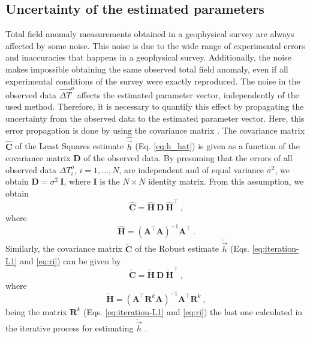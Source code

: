 \documentclass[journal abbreviation, npg]{copernicus}
\begin{document}
\subsection{Uncertainty of the estimated parameters}

Total field anomaly measurements obtained in a geophysical survey are always affected by some noise. This noise is due to the wide range of experimental errors and inaccuracies that happens in a geophysical survey. Additionally, the noise makes impossible obtaining the same observed total field anomaly, even if all experimental conditions of the survey were exactly reproduced. The noise in the observed data $\vec{\Delta T}^{o}$ affects the estimated parameter vector, independently of the used method. Therefore, it is necessary to quantify this effect by propagating the uncertainty from the observed data to the estimated parameter vector. Here, this error propagation is done by using the covariance matrix \citep{bard1973, aster-etal2005}. The covariance matrix $\hat{\mathbf{C}}$ of the Least Squares estimate $\hat{\vec{h}}$ (Eq. \ref{eq:h_hat}) is given as a function of the covariance matrix $\mathbf{D}$ of the observed data. By presuming that 
the errors of all observed data ${\Delta T}^{o}_{i}$, $i = 1, ..., N$, are independent and of equal variance $\sigma^{2}$, we obtain $\mathbf{D} = \sigma^{2} \: \mathbf{I}$, where $\mathbf{I}$ is the $N \times N$ identity matrix. From this assumption, we obtain
\begin{equation}
\hat{\mathbf{C}} = \hat{\mathbf{H}} \: \mathbf{D} \: \hat{\mathbf{H}}^{\intercal} \: ,
\label{eq:cov-h-hat}
\end{equation}
where
\begin{equation}
\hat{\mathbf{H}} = \left( \mathbf{A}^{\intercal}\mathbf{A} \right)^{-1} \mathbf{A}^{\intercal} \: .
\label{eq:H-h-hat}
\end{equation}
Similarly, the covariance matrix $\tilde{\mathbf{C}}$ of the Robust estimate $\tilde{\vec{h}}$ (Eqs. \ref{eq:iteration-L1} and \ref{eq:ri}) can be given by
\begin{equation}
\tilde{\mathbf{C}} = \tilde{\mathbf{H}} \: \mathbf{D} \: 
\tilde{\mathbf{H}}^{\intercal} \: ,
\label{eq:cov-h-tilde}
\end{equation}
where
\begin{equation}
\tilde{\mathbf{H}} = \left( \mathbf{A}^{\intercal} \mathbf{R}^{k} \mathbf{A} \right)^{-1}
\mathbf{A}^{\intercal} \mathbf{R}^{k} \: ,
\label{eq:H-h-tilde}
\end{equation}
being the matrix $\mathbf{R}^{k}$ (Eqs. \ref{eq:iteration-L1} and \ref{eq:ri}) the last one calculated in the iterative process for estimating $\tilde{\vec{h}}$ \citep{bard1973, aster-etal2005}.
\end{document}
